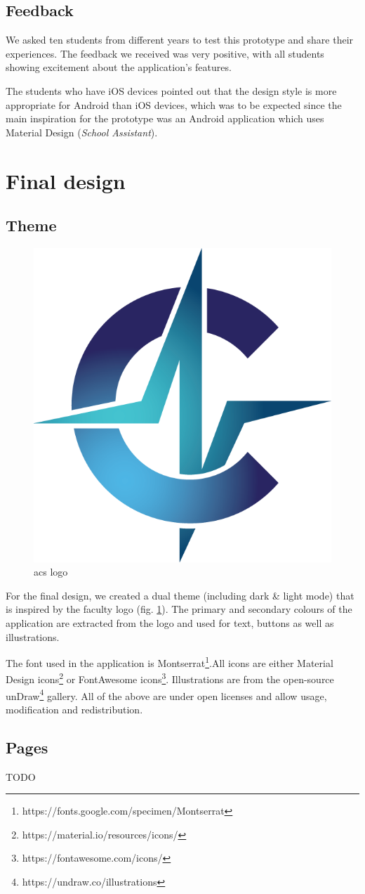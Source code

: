 \subsection{Feedback} \label{4:wireframe_feedback}

We asked ten students from different years to test this prototype and share their experiences. The feedback we received was very positive, with all students showing excitement about the application's features.

The students who have iOS devices pointed out that the design style is more appropriate for Android than iOS devices, which was to be expected since the main inspiration for the prototype was an Android application which uses Material Design\cite{google2020material} (\textit{School Assistant}).

\section{Final design} \label{4:final}

\subsection{Theme} \label{4:final_theme}

\begin{figure}
    \centering
    \includegraphics[width=0.15\columnwidth]{figures/logos/acs.png}
    \caption{\acrshort{acs} logo}
    \label{4:fig:acs_logo}
\end{figure}

For the final design, we created a dual theme (including dark \& light mode) that is inspired by the faculty logo (fig. \ref{4:fig:acs_logo}). The primary and secondary colours of the application are extracted from the logo and used for text, buttons as well as illustrations.

The font used in the application is Montserrat\footnote{https://fonts.google.com/specimen/Montserrat}.All icons are either Material Design icons\footnote{https://material.io/resources/icons/} or FontAwesome icons\footnote{https://fontawesome.com/icons/}. Illustrations are from the open-source unDraw\footnote{https://undraw.co/illustrations} gallery. All of the above are under open licenses and allow usage, modification and redistribution.

\subsection{Pages} \label{4:pages}

TODO